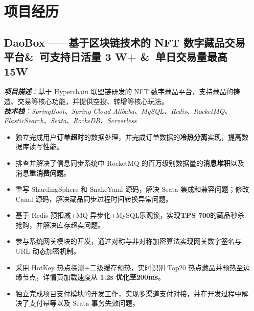 \documentclass{resume}
\renewcommand{\datedsubsection}[2]{
  \subsection*{\fontsize{10pt}{14pt}\selectfont \textbf{#1} \hfill #2}
}
\begin{document}












\section{\faCode 项目经历}

\datedsubsection{\textbf{DaoBox——基于区块链技术的 NFT 数字藏品交易平台\&\ 可支持日活量 3 W+ \&\ 单日交易量最高 15W}}{}
\setlength{\parindent}{0pt}
\textit{\textbf{项目描述}：}{基于 Hyperchain 联盟链研发的 NFT 数字藏品平台，支持藏品的铸造、交易等核心功能，并提供空投、转增等核心玩法。} \\
\textit{\textbf{技术栈}：SpringBoot、Spring        Cloud        Alibaba、MySQL、Redis、RocketMQ、ElasticSearch、Seata、RocksDB、Serverless
}{}

\begin{itemize}
    \item 独立完成用户\textbf{订单超时}的数据处理，并完成订单数据的\textbf{冷热分离}实现，提高数据库读写性能。
    \item 排查并解决了信息同步系统中        RocketMQ        的百万级别数据量的\textbf{消息堆积}以及消息\textbf{重消费问题}。
    \item 重写 ShardingSphere 和 SnakeYaml 源码，解决 Seata 集成和兼容问题；修改 Canal 源码，解决藏品同步过程时间转换异常问题。
    \item 基于 Redis 预扣减+MQ 异步化+MySQL乐观锁，实现\textbf{TPS 700}的藏品秒杀抢购，并解决库存超卖问题。
    \item 参与系统网关模块的开发，通过对称与非对称加密算法实现网关数字签名与 URL 动态加密机制。
    \item 采用 HotKey 热点探测+二级缓存预热，实时识别 Top20 热点藏品并预热至边缘节点，详情页加载速度从 \textbf{1.2s 优化至200ms}。
    \item 独立完成项目支付模块的开发工作，实现多渠道支付对接，并在开发过程中解决了支付幂等以及 Seata 事务失效问题。

\end{itemize}
\end{document}
